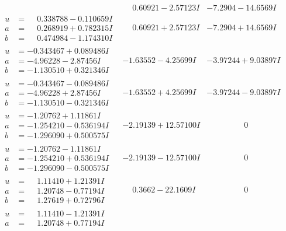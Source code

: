 \documentclass[1p]{elsarticle_modified}
\theoremstyle{definition}
\begin{document}
$$\begin{array}{c|c|c}
 & \phantom{-}0.60921 - 2.57123 I & -7.2904 - 14.6569 I \\ \hline\begin{aligned}
u &= \phantom{-}0.338788 - 0.110659 I \\
a &= \phantom{-}0.268919 + 0.782315 I \\
b &= \phantom{-}0.474984 - 1.174310 I\end{aligned}
 & \phantom{-}0.60921 + 2.57123 I & -7.2904 + 14.6569 I \\ \hline\begin{aligned}
u &= -0.343467 + 0.089486 I \\
a &= -4.96228 - 2.87456 I \\
b &= -1.130510 + 0.321346 I\end{aligned}
 & -1.63552 - 4.25699 I & -3.97244 + 9.03897 I \\ \hline\begin{aligned}
u &= -0.343467 - 0.089486 I \\
a &= -4.96228 + 2.87456 I \\
b &= -1.130510 - 0.321346 I\end{aligned}
 & -1.63552 + 4.25699 I & -3.97244 - 9.03897 I \\ \hline\begin{aligned}
u &= -1.20762 + 1.11861 I \\
a &= -1.254210 - 0.536194 I \\
b &= -1.296090 + 0.500575 I\end{aligned}
 & -2.19139 + 12.57100 I & \phantom{-0.000000 } 0 \\ \hline\begin{aligned}
u &= -1.20762 - 1.11861 I \\
a &= -1.254210 + 0.536194 I \\
b &= -1.296090 - 0.500575 I\end{aligned}
 & -2.19139 - 12.57100 I & \phantom{-0.000000 } 0 \\ \hline\begin{aligned}
u &= \phantom{-}1.11410 + 1.21391 I \\
a &= \phantom{-}1.20748 - 0.77194 I \\
b &= \phantom{-}1.27619 + 0.72796 I\end{aligned}
 & \phantom{-}0.3662 - 22.1609 I & \phantom{-0.000000 } 0 \\ \hline\begin{aligned}
u &= \phantom{-}1.11410 - 1.21391 I \\
a &= \phantom{-}1.20748 + 0.77194 I \\

\end{aligned}
\end{array}$$
\end{document}
